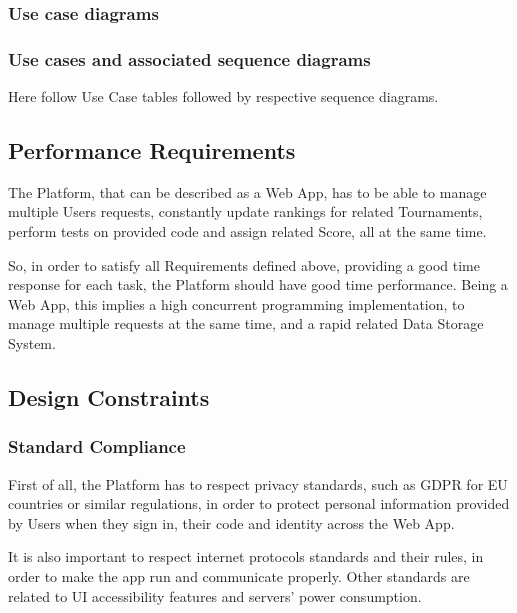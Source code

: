 \newpage

\subsubsection{Use case diagrams}

\newpage

\subsubsection{Use cases and associated sequence diagrams}
Here follow Use Case tables followed by respective sequence diagrams.


\subsection{Performance Requirements}
The Platform, that can be described as a Web App, has to be able to manage multiple Users requests, constantly update rankings for related Tournaments, perform tests on provided code and assign related Score, all at the same time. 

So, in order to satisfy all Requirements defined above, providing a good time response for each task, the Platform should have good time performance. Being a Web App, this implies a high concurrent programming implementation, to 
manage multiple requests at the same time, and a rapid related Data Storage System. 

\subsection{Design Constraints}

\subsubsection{Standard Compliance}
First of all, the Platform has to respect privacy standards, such as GDPR for EU countries or similar regulations, in order to protect personal information provided by Users when they sign in, their code and identity across the Web App.

It is also important to respect internet protocols standards and their rules, in order to make the app run and communicate properly. Other standards are related to UI accessibility features and servers' power consumption. 

